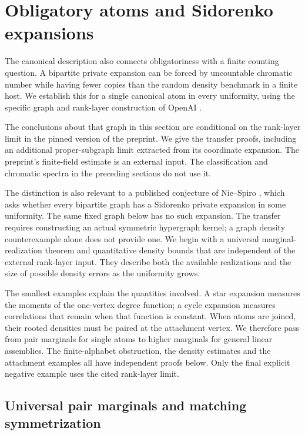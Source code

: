 \documentclass[a4paper,11pt,reqno]{amsart}
\theoremstyle{plain}
\theoremstyle{definition}
\theoremstyle{remark}
\begin{document}
\section{Obligatory atoms and Sidorenko expansions}
\label{density-extension}

The canonical description also connects obligatoriness with a finite
counting question.  A bipartite private expansion can be forced by
uncountable chromatic number while having fewer copies than the random
density benchmark in a finite host.  We establish this for a single
canonical atom in every uniformity, using the specific graph and
rank-layer construction of OpenAI \citep{openai161}.

The conclusions about that graph in this section are conditional on
the rank-layer limit in the pinned version of the preprint.  We give
the transfer proofs, including an additional proper-subgraph limit
extracted from its coordinate expansion.  The preprint's finite-field
estimate is an external input.  The classification and chromatic
spectra in the preceding sections do not use it.

The distinction is also relevant to a published conjecture of
Nie--Spiro \citep[Conjecture~5.1]{niespiro2025}, which asks whether
every bipartite graph has a Sidorenko private expansion in some
uniformity.  The same fixed graph below has no such expansion.
The transfer requires constructing an actual symmetric hypergraph
kernel; a graph density counterexample alone does not provide one.
We begin with a universal marginal-realization theorem and
quantitative density bounds that are independent of the external
rank-layer input.  They describe both the available realizations
and the size of possible density errors as the uniformity grows.

The smallest examples explain the quantities involved.  A star
expansion measures the moments of the one-vertex degree function;
a cycle expansion measures correlations that remain when that
function is constant.  When atoms are joined, their rooted densities
must be paired at the attachment vertex.  We therefore pass from
pair marginals for single atoms to higher marginals for general
linear assemblies.  The finite-alphabet obstruction, the density
estimates and the attachment examples all have independent proofs
below.  Only the final explicit negative example uses the cited
rank-layer limit.

\subsection{Universal pair marginals and matching symmetrization}
\end{document}
